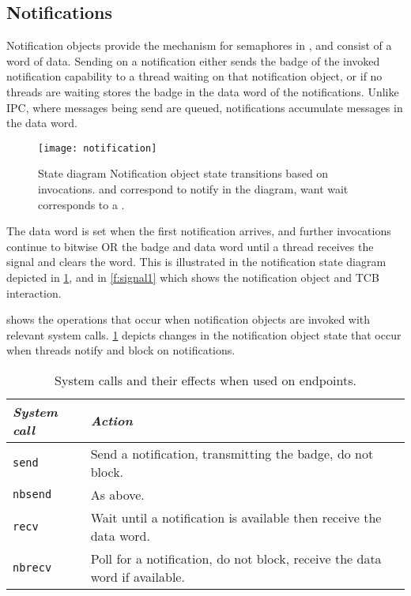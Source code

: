 \subsection{Notifications}
\label{p:sel4_notifications}

Notification objects provide the mechanism for semaphores in \selfour, and consist of a word of
data. Sending on a notification either sends the badge of the invoked notification capability to a 
thread waiting on that notification object, or if no threads are waiting stores the badge in the
data word of the notifications. Unlike IPC, where messages being send are queued, notifications
accumulate messages in the data word.

\begin{figure}
    \centering
    \texttt{[image: notification]}
    \caption{State diagram Notification object state transitions based on invocations.  and
     correspond to notify in the diagram, want wait corresponds to a .}
    \label{f:notification}
\end{figure}

The data word is set when the first notification arrives, and further invocations continue to bitwise OR the badge and data word
until a thread receives the signal and clears the word. This is illustrated in the notification
state diagram depicted in \cref{f:notification}, and in \cref{f:signal1} which shows the
notification object and TCB interaction.

 shows the operations that occur when notification objects are
invoked with relevant system calls. \cref{f:notification} depicts changes in the notification object
state that occur when threads notify and block on notifications. 

\begin{table} 
    \centering
    \begin{tabularx}{\textwidth}{lX}\toprule
        \emph{System call} & \emph{Action} \\\midrule
        \texttt{send}   & Send a notification, transmitting the badge, do not block. \\ 
        \texttt{nbsend} & As above. \\
        \texttt{recv}   & Wait until a notification is available then receive the data word.  \\
        \texttt{nbrecv} & Poll for a notification, do not block, receive the data word if available. \\
        \bottomrule
    \end{tabularx}
    \caption{System calls and their effects when used on endpoints.}
    \label{t:notification-system-calls}
\end{table}


